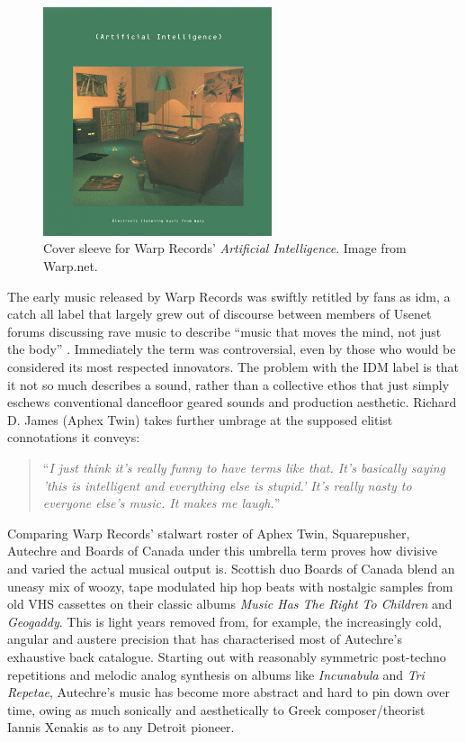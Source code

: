 \begin{figure}
	\begin{center}
		\includegraphics[width=0.6\textwidth]{ch02_dancemusic/figures/warp.jpg}
	\end{center}
	\caption[Cover sleeve for \textit{Artificial Intelligence} (Warp Records)]{Cover sleeve for Warp Records' \textit{Artificial Intelligence}. Image from Warp.net.}
	\label{fig:roland}
\end{figure}

The early music released by Warp Records was swiftly retitled by fans as \acrfull{idm}, a catch all label that largely grew out of discourse between members of Usenet forums discussing rave music to describe “music that moves the mind, not just the body” \citep{Alwakeel2009}. Immediately the term was controversial, even by those who would be considered its most respected innovators.  The problem with the IDM label is that it not so much describes a sound, rather than a collective ethos that just simply eschews conventional dancefloor geared sounds and production aesthetic. Richard D. James (Aphex Twin) takes further umbrage at the supposed elitist connotations it conveys:

\blockcquote[]{Haworth2015}{``\textit{I just think it's really funny to have terms like that. It's basically saying 'this is intelligent and everything else is stupid.' It's really nasty to everyone else's music. It makes me laugh.}''}

Comparing Warp Records’ stalwart roster of Aphex Twin, Squarepusher, Autechre and Boards of Canada under this umbrella term proves how divisive and varied the actual musical output is. Scottish duo Boards of Canada blend an uneasy mix of woozy, tape modulated hip hop beats with nostalgic samples from old VHS cassettes on their classic albums \textit{Music Has The Right To Children} and \textit{Geogaddy}. This is light years removed from, for example, the increasingly cold, angular and austere precision that has characterised most of Autechre’s exhaustive back catalogue. Starting out with reasonably symmetric post-techno repetitions and melodic analog synthesis on albums like \textit{Incunabula} and \textit{Tri Repetae}, Autechre’s music has become more abstract and hard to pin down over time, owing as much sonically and aesthetically to Greek composer/theorist Iannis Xenakis as to any Detroit pioneer.

